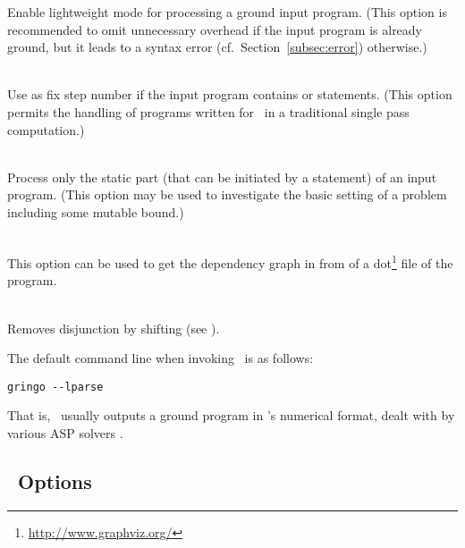 \begin{description}
Enable lightweight mode for processing a ground input program.
(This option is recommended to 
 omit unnecessary overhead if the input program is already ground,
 but it leads to a syntax error (cf.\ Section~\ref{subsec:error}) otherwise.)
\item[\code{--ifixed=\textit{n}}]~\\
Use  as fix step number if the input program
contains  or  statements.
(This option permits the handling of programs written for \iclingo\
 in a traditional single pass computation.)
\item[\code{--ibase}]~\\
Process only the static part (that can be initiated by a  statement)
of an input program.
(This option may be used to investigate the basic setting of a problem
 including some mutable bound.)
\item[\code{--dep-graph=filename}]~\\
This option can be used to get the dependency graph in from
of a dot\footnote{\url{http://www.graphviz.org/}} file of the program.
\item[\code{--shift}]~\\
Removes disjunction by shifting (see \cite{gellif91a}).
\end{description}
%
The default command line when invoking \gringo\ is as follows:
%
\begin{lstlisting}[numbers=none]
gringo --lparse
\end{lstlisting}
That is, \gringo\ usually outputs a ground program in \lparse's numerical format,
dealt with by various ASP solvers \cite{gekanesc07b,siniso02a,linzha04a}.


\subsection{\clingo\ Options}\label{subsec:opt:clingo}

